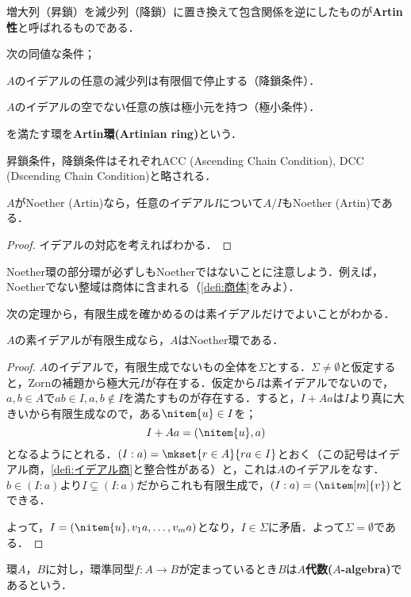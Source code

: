 増大列（昇鎖）を減少列（降鎖）に置き換えて包含関係を逆にしたものが\textbf{Artin性}と呼ばれるものである．

\begin{defi}[Artin環]
	次の同値な条件；
	\begin{sakura}
		\item  $A$のイデアルの任意の減少列は有限個で停止する（降鎖条件）．
		\item $A$のイデアルの空でない任意の族は極小元を持つ（極小条件）．
	\end{sakura}
	を満たす環を\textbf{Artin環(Artinian ring)}という．
\end{defi}

昇鎖条件，降鎖条件はそれぞれACC (Ascending Chain Condition), DCC (Dscending Chain Condition)と略される．

\begin{prop}
	$A$がNoether (Artin)なら，任意のイデアル$I$について$A/I$もNoether (Artin)である．
\end{prop}
\begin{proof}
	イデアルの対応を考えればわかる．
\end{proof}

Noether環の部分環が必ずしもNoetherではないことに注意しよう．例えば，Noetherでない整域は商体に含まれる（\ref{defi:商体}をみよ）．

次の定理から，有限生成を確かめるのは素イデアルだけでよいことがわかる．
\begin{thm}[I. S. Cohen]\label{thm:CohenのNoether判定法}
	$A$の素イデアルが有限生成なら，$A$はNoether環である．
\end{thm}
\begin{proof}
	$A$のイデアルで，有限生成でないもの全体を$\Sigma$とする．$\Sigma\neq\emptyset$と仮定すると，Zornの補題から極大元$I$が存在する．仮定から$I$は素イデアルでないので，$a,b\in A$で$ab\in I,a,b\not\in I$を満たすものが存在する．すると，$I+Aa$は$I$より真に大きいから有限生成なので，ある$\nitem{u}\in I$を；
	\[I+Aa=(\nitem{u},a)\]
	となるようにとれる．$(I:a)=\mkset{r\in A}{ra\in I}$とおく（この記号はイデアル商，\ref{defi:イデアル商}と整合性がある）と，これは$A$のイデアルをなす．$b\in (I:a)$より$I\subsetneq(I:a)$だからこれも有限生成で，$(I:a)=(\nitem[m]{v})$とできる．
	
	よって，$I=(\nitem{u},v_1a,\dots,v_ma)$となり，$I\in\Sigma$に矛盾．よって$\Sigma=\emptyset$である．
\end{proof}

\begin{defi}[$A$代数]
	環$A，B$に対し，環準同型$f:A\to B$が定まっているとき$B$は\textbf{$A$代数($A$-algebra)}であるという．
\end{defi}

